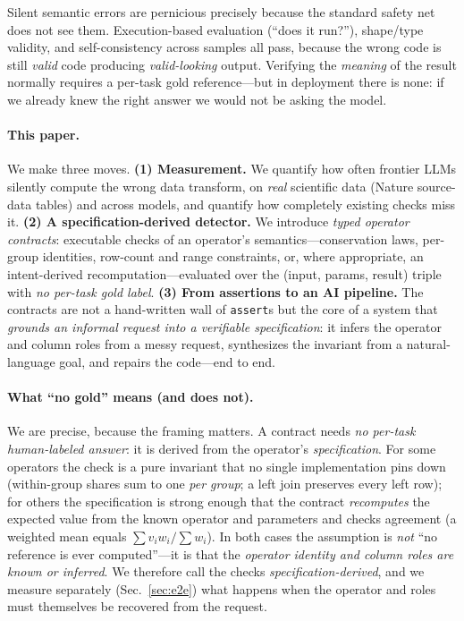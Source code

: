 \documentclass[10pt,twocolumn,letterpaper]{article}
\begin{document}
Silent semantic errors are pernicious precisely because the standard safety net
does not see them. Execution-based evaluation (``does it run?''), shape/type
validity, and self-consistency across samples all pass, because the wrong code
is still \emph{valid} code producing \emph{valid-looking} output. Verifying the
\emph{meaning} of the result normally requires a per-task gold reference---but in
deployment there is none: if we already knew the right answer we would not be
asking the model.

\paragraph{This paper.} We make three moves. \textbf{(1) Measurement.} We
quantify how often frontier LLMs silently compute the wrong data transform, on
\emph{real} scientific data (Nature source-data tables) and across models, and
quantify how completely existing checks miss it. \textbf{(2) A
specification-derived detector.} We introduce \emph{typed operator contracts}:
executable checks of an operator's semantics---conservation laws, per-group
identities, row-count and range constraints, or, where appropriate, an
intent-derived recomputation---evaluated over the (input, params, result) triple
with \emph{no per-task gold label}. \textbf{(3) From assertions to an AI
pipeline.} The contracts are not a hand-written wall of \texttt{assert}s but the
core of a system that \emph{grounds an informal request into a verifiable
specification}: it infers the operator and column roles from a messy request,
synthesizes the invariant from a natural-language goal, and repairs the
code---end to end.

\paragraph{What ``no gold'' means (and does not).} We are precise, because the
framing matters. A contract needs \emph{no per-task human-labeled answer}: it is
derived from the operator's \emph{specification}. For some operators the check is
a pure invariant that no single implementation pins down (within-group shares
sum to one \emph{per group}; a left join preserves every left row); for others
the specification is strong enough that the contract \emph{recomputes} the
expected value from the known operator and parameters and checks agreement (a
weighted mean equals $\sum v_iw_i/\sum w_i$). In both cases the assumption is
\emph{not} ``no reference is ever computed''---it is that the \emph{operator
identity and column roles are known or inferred}. We therefore call the checks
\emph{specification-derived}, and we measure separately (Sec.~\ref{sec:e2e})
what happens when the operator and roles must themselves be recovered from the
request.
\end{document}
